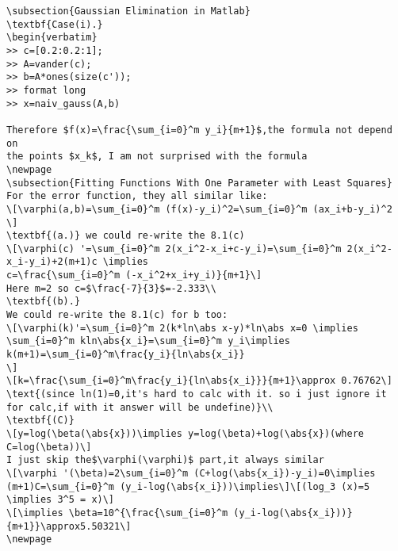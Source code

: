 \begin{verbatim}
\subsection{Gaussian Elimination in Matlab}
\textbf{Case(i).} 
\begin{verbatim}
>> c=[0.2:0.2:1];
>> A=vander(c);
>> b=A*ones(size(c'));
>> format long
>> x=naiv_gauss(A,b)

Therefore $f(x)=\frac{\sum_{i=0}^m y_i}{m+1}$,the formula not depend on
the points $x_k$, I am not surprised with the formula
\newpage
\subsection{Fitting Functions With One Parameter with Least Squares}
For the error function, they all similar like:
\[\varphi(a,b)=\sum_{i=0}^m (f(x)-y_i)^2=\sum_{i=0}^m (ax_i+b-y_i)^2 \]
\textbf{(a.)} we could re-write the 8.1(c)
\[\varphi(c) '=\sum_{i=0}^m 2(x_i^2-x_i+c-y_i)=\sum_{i=0}^m 2(x_i^2-x_i-y_i)+2(m+1)c \implies
c=\frac{\sum_{i=0}^m (-x_i^2+x_i+y_i)}{m+1}\]
Here m=2 so c=$\frac{-7}{3}$=-2.333\\
\textbf{(b).}
We could re-write the 8.1(c) for b too:
\[\varphi(k)'=\sum_{i=0}^m 2(k*ln\abs x-y)*ln\abs x=0 \implies \sum_{i=0}^m kln\abs{x_i}=\sum_{i=0}^m y_i\implies k(m+1)=\sum_{i=0}^m\frac{y_i}{ln\abs{x_i}}
\]
\[k=\frac{\sum_{i=0}^m\frac{y_i}{ln\abs{x_i}}}{m+1}\approx 0.76762\]
\text{(since ln(1)=0,it's hard to calc with it. so i just ignore it for calc,if with it answer will be undefine)}\\
\textbf{(C)}
\[y=log(\beta(\abs{x}))\implies y=log(\beta)+log(\abs{x})(where C=log(\beta))\]
I just skip the$\varphi(\varphi)$ part,it always similar
\[\varphi '(\beta)=2\sum_{i=0}^m (C+log(\abs{x_i})-y_i)=0\implies (m+1)C=\sum_{i=0}^m (y_i-log(\abs{x_i}))\implies\]\[(log_3 (x)=5 \implies 3^5 = x)\]
\[\implies \beta=10^{\frac{\sum_{i=0}^m (y_i-log(\abs{x_i}))}{m+1}}\approx5.50321\]
\newpage

\end{verbatim}
